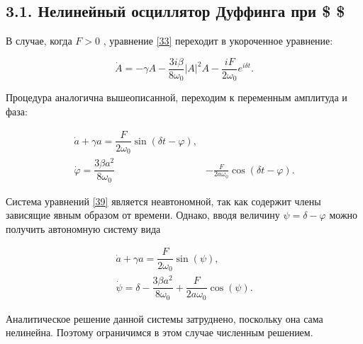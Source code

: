 \documentclass[11pt]{article}
\begin{document}
    \hypertarget{ux43dux435ux43bux438ux43dux435ux439ux43dux44bux439-ux43eux441ux446ux438ux43bux43bux44fux442ux43eux440-ux434ux443ux444ux444ux438ux43dux433ux430-ux43fux440ux438}{%
\subsection{\texorpdfstring{3.1. Нелинейный осциллятор Дуффинга при \$
\$}{3.1. Нелинейный осциллятор Дуффинга при \$ \$}}\label{ux43dux435ux43bux438ux43dux435ux439ux43dux44bux439-ux43eux441ux446ux438ux43bux43bux44fux442ux43eux440-ux434ux443ux444ux444ux438ux43dux433ux430-ux43fux440ux438}}

В случае, когда \(F > 0\) , уравнение \eqref{33} переходит в укороченное
уравнение:

\begin{equation}
\label{38}
\dot{A}=-\gamma A-\frac{3 i \beta}{8 \omega_{0}}|A|^{2} A-\frac{i F}{2 \omega_{0}} e^{i \delta t}.
\end{equation}

Процедура аналогична вышеописанной, переходим к переменным амплитуда и
фаза:

\begin{equation}
\label{39}
\begin{aligned}
\dot{a} + \gamma a = \dfrac{F}{2 \omega_{0}} \sin(\delta t-\varphi), \\
\dot{\varphi} = \dfrac{3 \beta a^{2}}{8 \omega_{0}} &-\frac{F}{2 a \omega_{0}} \cos(\delta t-\varphi).
\end{aligned}
\end{equation}

Система уравнений \eqref{39} является неавтономной, так как содержит
члены зависящие явным образом от времени. Однако, вводя величину
\(\psi = \delta − \varphi\) можно получить автономную систему вида

\begin{equation}
\label{40}
\begin{array}{c}
\dot{a}+\gamma a = \dfrac{F}{2 \omega_{0}} \sin( \psi), \\
\dot{\psi} = \delta-\dfrac{3 \beta a^{2}}{8 \omega_{0}}+\dfrac{F}{2 a \omega_{0}} \cos( \psi).
\end{array}
\end{equation}

Аналитическое решение данной системы затруднено, поскольку она сама
нелинейна. Поэтому ограничимся в этом случае численным решением.
\end{document}
